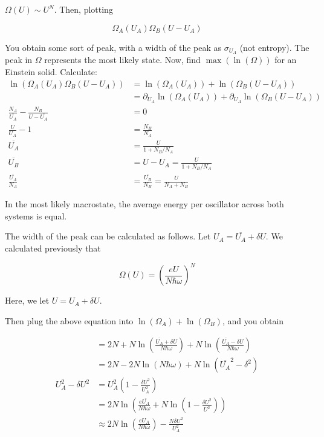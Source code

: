 \documentclass{article}
\newtheorem{one minute paper}[theorem]{One Minute Paper}
\begin{document}
$\Omega(U) \sim U^N$. Then, plotting 

\begin{equation}
    \Omega_A(U_A)\Omega_B(U- U_A)
\end{equation}

You obtain some sort of peak, with a width of the peak as $\sigma_{U_A}$ (not entropy). The peak in $\Omega$ represents the most likely state. Now, find $\max(\ln(\Omega))$ for an Einstein solid. Calculate:
\begin{align}
    \ln(\Omega_A(U_A)\Omega_B(U - U_A)) &= \ln(\Omega_A(U_A)) + \ln(\Omega_B(U - U_A)) \\
    &= \partial_{U_A}\ln(\Omega_A(U_A)) + \partial_{U_A}\ln(\Omega_B(U - U_A)) \\
    \frac{N_A}{\overline{U_A}} - \frac{N_B}{U - \overline{U_A}} &= 0 \\
    \frac{U}{U_A} - 1 &= \frac{N_B}{N_A}\\
    \overline{U_A} &= \frac{U}{1 + N_B/N_A}\\
    \overline{U_B} &= U - U_A = \frac{U}{1 + N_B/N_A}\\
    \frac{\overline{U_A}}{N_A} &= \frac{\overline{U_B}}{N_B} = \frac{U}{N_A + N_B}
\end{align} 

In the most likely macrostate, the average energy per oscillator across both systems is equal. 

The width of the peak can be calculated as follows. Let $U_A = \overline{U_A} + \delta U$. We calculated previously that 

\begin{equation}
    \Omega(U) = \left( \frac{eU}{N \hbar \omega} \right)^N
\end{equation}

Here, we let $U = U_A + \delta U$.

Then plug the above equation into $\ln(\Omega_A) + \ln(\Omega_B)$, and you obtain 

\begin{align}
    &= 2N + N \ln\left( \frac{\overline{U_A} + \delta U}{N \hbar \omega} \right) + N\ln\left( \frac{\overline{U_A} - \delta U}{N \hbar \omega} \right) \\
    &= 2N - 2N\ln(N \hbar \omega) + N\ln(\overline{U_A}^{2} - \delta^2)\\
    U_A^2 - \delta U^2 &= U_A^2\left( 1 - \frac{\delta U^2}{U_A^2} \right) \\
    &= 2N \ln\left( \frac{e \overline{U_A}}{N\hbar \omega} + N\ln\left( 1- \frac{\delta U^2}{U^2} \right) \right) \\
    &\approx 2N\ln\left( \frac{eU_A}{N\hbar \omega}\right) - \frac{N \delta U^2}{U_A^2}
\end{align}
\end{document}
